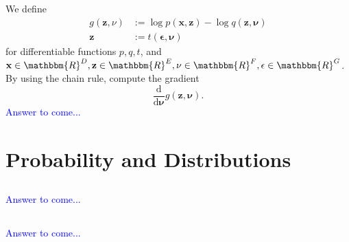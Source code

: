 \documentclass[a4paper,12pt]{article}
\newcommand{\R}{\mathbbm{R}}
\newcommand{\vecx}{\textbf{x}}
\newcommand{\vecz}{\textbf{z}}
\begin{document}
\subsection{}
We define
\begin{align*}
g(\vecz,
\textbf{$\nu$})
&:=
\log p(\vecx, \vecz) - \log q(\vecz, \mathbf{\nu}) \\
\vecz
&:=
t(\mathbf{\epsilon}, \mathbf{\nu})
\end{align*}
for differentiable functions $p,q,t$, and $\vecx \in \R^D, \vecz \in \R^E, \mathbf{\nu} \in \R ^F, \mathbf{\epsilon} \in \R^G$. By using the chain rule, compute the gradient $$\dfrac{\textrm{d}}{\textrm{d} \mathbf{\nu}} g(\vecz, \mathbf{\nu}).$$
\textcolor{blue}{
Answer to come...
}
\newpage%
\section{Probability and Distributions}
\subsection{}

\textcolor{blue}{
Answer to come...
}
\subsection{}

\textcolor{blue}{
Answer to come...
}
\subsection{}
\end{document}
